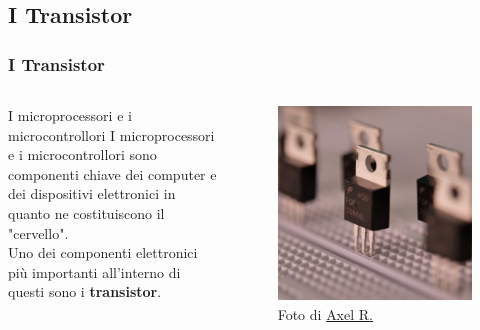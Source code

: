 \subsection[I Transistor]{I Transistor}
\begin{frame}
	\frametitle{I Transistor}
	
	\begin{columns}			
		\begin{block}{I microprocessori e i microcontrollori}
			I microprocessori e i microcontrollori sono componenti chiave dei computer e dei dispositivi elettronici in quanto ne costituiscono il "cervello".\\
			Uno dei componenti elettronici più importanti all'interno di questi sono i \textbf{transistor}.
		\end{block}
		
		\begin{figure}[!htbp]
			\centering 
			\includegraphics[width=0.95\linewidth]{images/2_le_architetture/transistor.jpg}
			\caption{Foto di \href{https://unsplash.com/it/@trisolarian}{Axel R.}}
		\end{figure}		
	\end{columns}
	
\end{frame}




